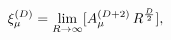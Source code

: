 \begin{equation}
\xi_{\mu}^{(D)}=\lim_{R \rightarrow \infty} [A_{\mu}^{(D+2)} \, R^{D \over 2}],
\label{gaug}
\end{equation}


